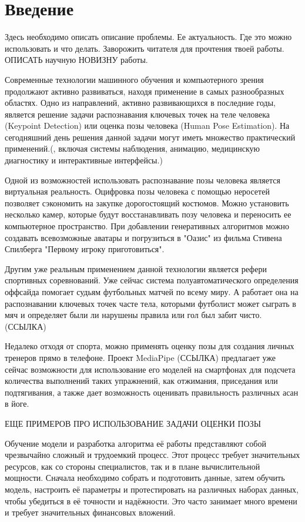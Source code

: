 \section{Введение}
\label{sec:Chapter0} 

Здесь необходимо описать описание проблемы. Ее актуальность. Где это можно использовать и что делать. Заворожить читателя для прочтения твоей работы.
ОПИСАТЬ научную НОВИЗНУ работы.

Современные технологии машинного обучения и компьютерного зрения продолжают активно развиваться, находя применение в самых разнообразных областях. Одно из направлений, активно развивающихся в последние годы, является решение задачи распознавания ключевых точек на теле человека (Keypoint Detection) или оценка позы человека (Human Pose Estimation). На сегодняшний день решения данной задачи могут иметь множество практический применений.(, включая системы наблюдения, анимацию, медицинскую диагностику и интерактивные интерфейсы.)

Одной из возможностей использовать распознавание позы человека является виртуальная реальность. Оцифровка позы человека с помощью неросетей позволяет сэкономить на закупке дорогостоящий костюмов. Можно установить несколько камер, которые будут восстанавливать позу человека и переносить ее компьютерное пространство. При добавлении генеративных алгоритмов можно создавать всевозможные аватары и погрузиться в "Оазис" из фильма Стивена Спилберга "Первому игроку приготовиться".

Другим уже реальным применением данной технологии является рефери спортивных соревнований. Уже сейчас система полуавтоматического определения оффсайда помогает судьям футбольных матчей по всему миру. А работает она на распознавании ключевых точек часте тела, которыми футболист может сыграть в мяч и определяет были ли нарушены правила или гол был забит чисто.  (ССЫЛКА)

Недалеко отходя от спорта, можно применять оценку позы для создания личных тренеров прямо в телефоне. Проект MediaPipe (ССЫЛКА) предлагает уже сейчас возможности для использование его моделей на смартфонах для подсчета количества выполнений таких упражнений, как отжимания, приседания или подтягивания, а также дает возможность оценивать правильность различных асан в йоге.

ЕЩЕ ПРИМЕРОВ ПРО ИСПОЛЬЗОВАНИЕ ЗАДАЧИ ОЦЕНКИ ПОЗЫ

\hfill \break
Обучение модели и разработка алгоритма её работы представляют собой чрезвычайно сложный и трудоемкий процесс. Этот процесс требует значительных ресурсов, как со стороны специалистов, так и в плане вычислительной мощности. Сначала необходимо собрать и подготовить данные, затем обучить модель, настроить её параметры и протестировать на различных наборах данных, чтобы убедиться в её точности и надёжности. Это часто занимает много времени и требует значительных финансовых вложений. 


